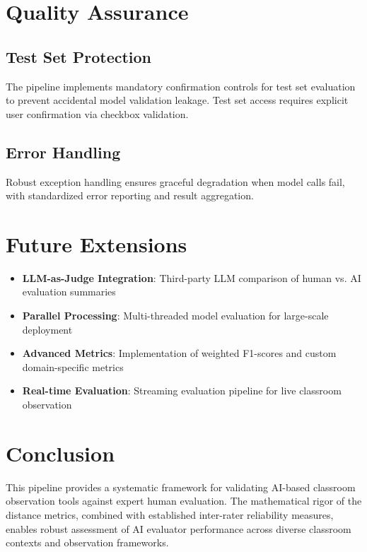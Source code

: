 \documentclass[12pt]{article}
\begin{document}
\section{Quality Assurance}

\subsection{Test Set Protection}
The pipeline implements mandatory confirmation controls for test set evaluation to prevent accidental model validation leakage. Test set access requires explicit user confirmation via checkbox validation.

\subsection{Error Handling}
Robust exception handling ensures graceful degradation when model calls fail, with standardized error reporting and result aggregation.

\section{Future Extensions}

\begin{itemize}
    \item \textbf{LLM-as-Judge Integration}: Third-party LLM comparison of human vs. AI evaluation summaries
    \item \textbf{Parallel Processing}: Multi-threaded model evaluation for large-scale deployment
    \item \textbf{Advanced Metrics}: Implementation of weighted F1-scores and custom domain-specific metrics
    \item \textbf{Real-time Evaluation}: Streaming evaluation pipeline for live classroom observation
\end{itemize}

\section{Conclusion}

This pipeline provides a systematic framework for validating AI-based classroom observation tools against expert human evaluation. The mathematical rigor of the distance metrics, combined with established inter-rater reliability measures, enables robust assessment of AI evaluator performance across diverse classroom contexts and observation frameworks.
\end{document}

